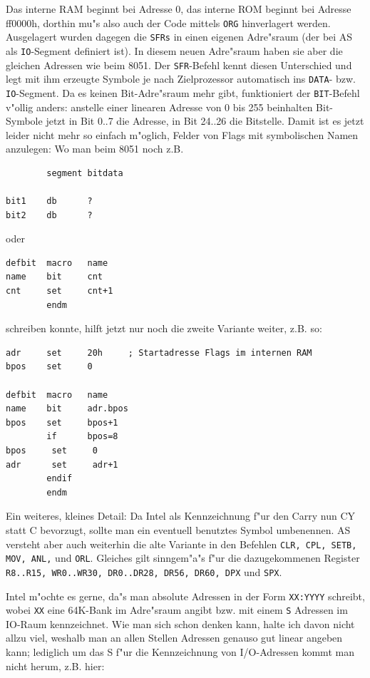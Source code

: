 \documentclass[12pt,a4paper,twoside]{report}
\newcommand{\tty}[1]{{\tt #1}}
\newcommand{\asname}{AS}
\begin{document}
Das interne RAM beginnt bei Adresse 0, das interne ROM beginnt bei
Adresse ff0000h, dorthin mu"s also auch der Code mittels \tty{ORG}
hinverlagert werden.  Ausgelagert wurden dagegen die \tty{SFRs} in einen
eigenen Adre"sraum (der bei \asname{} als \tty{IO}-Segment definiert ist).  In
diesem neuen Adre"sraum haben sie aber die gleichen Adressen wie beim 8051.
Der \tty{SFR}-Befehl kennt diesen Unterschied und legt mit ihm erzeugte
Symbole je nach Zielprozessor automatisch ins \tty{DATA}- bzw.
\tty{IO}-Segment.  Da es keinen Bit-Adre"sraum mehr gibt, funktioniert der
\tty{BIT}-Befehl v"ollig anders: anstelle einer linearen Adresse von 0 bis
255 beinhalten Bit-Symbole jetzt in Bit 0..7 die Adresse, in Bit 24..26
die Bitstelle.  Damit ist es jetzt leider nicht mehr so einfach m"oglich,
Felder von Flags mit symbolischen Namen anzulegen: Wo man beim 8051 noch
z.B.
\begin{verbatim}
        segment bitdata

bit1    db      ?
bit2    db      ?
\end{verbatim}
oder
\begin{verbatim}
defbit	macro   name
name    bit     cnt
cnt     set     cnt+1
        endm
\end{verbatim}
schreiben konnte, hilft jetzt nur noch die zweite Variante weiter, z.B.
so:
\begin{verbatim}
adr     set     20h     ; Startadresse Flags im internen RAM
bpos    set     0

defbit  macro   name
name    bit     adr.bpos
bpos    set     bpos+1
        if      bpos=8
bpos     set     0
adr      set     adr+1
        endif
        endm
\end{verbatim}
Ein weiteres, kleines Detail: Da Intel als Kennzeichnung f"ur den Carry
nun CY statt C bevorzugt, sollte man ein eventuell benutztes Symbol
umbenennen.  \asname{} versteht aber auch weiterhin die alte Variante in den
Befehlen \tty{CLR, CPL, SETB, MOV, ANL,} und \tty{ORL}.  Gleiches gilt
sinngem"a"s f"ur die dazugekommenen Register \tty{R8..R15, WR0..WR30,
DR0..DR28, DR56, DR60, DPX} und \tty{SPX}.
\par
Intel m"ochte es gerne, da"s man absolute Adressen in der Form \tty{XX:YYYY}
schreibt, wobei \tty{XX} eine 64K-Bank im Adre"sraum angibt bzw. mit einem
\tty{S} Adressen im IO-Raum kennzeichnet.  Wie man sich schon denken kann,
halte ich davon nicht allzu viel, weshalb man an allen Stellen Adressen
genauso gut linear angeben kann; lediglich um das S f"ur die Kennzeichnung
von I/O-Adressen kommt man nicht herum, z.B. hier:
\end{document}
